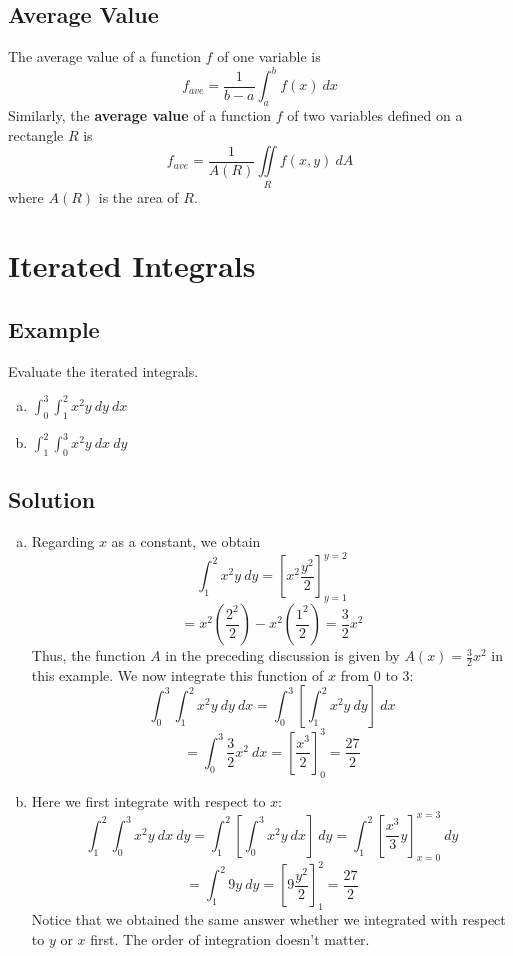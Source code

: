 \subsection*{Average Value}
The average value of a function $f$ of one variable is
$$f_{ave}=\frac{1}{b-a}\int_a^b f(x)\:dx$$
Similarly, the \textbf{average value} of a function $f$ of two variables defined on
a rectangle $R$ is
$$f_{ave}=\frac{1}{A(R)}\iint\limits_R f(x,y)\:dA$$
where $A(R)$ is the area of $R$.

\section{Iterated Integrals}

\subsection*{Example}
Evaluate the iterated integrals.
\begin{enumerate}[(a)]
    \item $\int_0^3 \int_1^2 x^2y\:dy\:dx$
    \item $\int_1^2 \int_0^3 x^2y\:dx\:dy$
\end{enumerate}

\subsection*{Solution}
\begin{enumerate}[(a)]
    \item Regarding $x$ as a constant, we obtain
          $$\int_1^2 x^2y\:dy=\left[x^2\frac{y^2}{2}\right]_{y=1}^{y=2}$$
          $$=x^2\left(\frac{2^2}{2}\right)-x^2\left(\frac{1^2}{2}\right)=\frac{3}{2}x^2$$
          Thus, the function $A$ in the preceding discussion is given by $A(x)=\frac{3}{2}x^2$
          in this example. We now integrate this function of $x$ from 0 to 3:
          $$\int_0^3 \int_1^2 x^2y\:dy\:dx=\int_0^3\left[\int_1^2 x^2y\:dy\right]\:dx$$
          $$=\int_0^3 \frac{3}{2}x^2\:dx=\left[\frac{x^3}{2}\right]_0^3=\frac{27}{2}$$
    \item Here we first integrate with respect to $x$:
          $$\int_1^2 \int_0^3 x^2y\:dx\:dy=\int_1^2\left[\int_0^3 x^2y\:dx\right]\:dy=
              \int_1^2\left[\frac{x^3}{3}y\right]_{x=0}^{x=3}\:dy$$
          $$=\int_1^2 9y\:dy=\left[9\frac{y^2}{2}\right]_1^2=\frac{27}{2}$$
          Notice that we obtained the same answer whether we integrated with respect to
          $y$ or $x$ first. The order of integration doesn't matter.
\end{enumerate}

